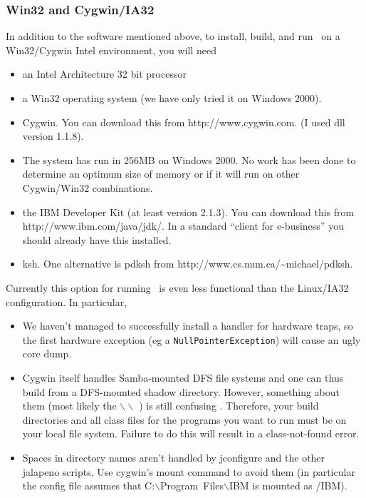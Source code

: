 \subsubsection{Win32 and Cygwin/IA32}
In addition to the software mentioned above, to install, build, and
run \jp\ on a Win32/Cygwin Intel environment, you will need 
\begin{itemize}
\item an Intel Architecture 32 bit processor
\item a Win32 operating system (we have only tried it on Windows 2000).
\item Cygwin. You can download this from 
           {http://www.cygwin.com}. (I used dll version 1.1.8).
\item The system has run in 256MB on Windows 2000. No work has been
done to determine an optimum size of memory or if it will run on other
Cygwin/Win32 combinations.
\item the IBM Developer Kit (at least version 2.1.3).  You can download this from
           {http://www.ibm.com/java/jdk/}.
In a standard ``client for e-business'' you should already have this
installed.
\item ksh.  One alternative is pdksh from 
       {http://www.cs.mun.ca/\~{}michael/pdksh}.
\end{itemize}
Currently this option for running \jp\ is even less functional than
the Linux/IA32 configuration. In particular,
\begin{itemize}
\item We haven't managed to successfully install a handler for hardware traps,
so the first hardware exception (eg a {\tt NullPointerException}) will cause
an ugly core dump.
\item Cygwin itself handles Samba-mounted DFS file
systems and one can thus build from a DFS-mounted shadow
directory. However, something about them (most likely the 
$\backslash\backslash$ ) is
still confusing \jp.  Therefore, your build directories and all class
files for the programs you want to run must be on your local file
system. Failure to do this will result in a class-not-found error.
\item Spaces in directory names aren't handled by jconfigure and the
other jalapeno scripts.  Use cygwin's mount command to avoid them (in
particular the config file assumes that
C:$\backslash$Program~Files$\backslash$IBM is mounted as /IBM).
\end{itemize}


